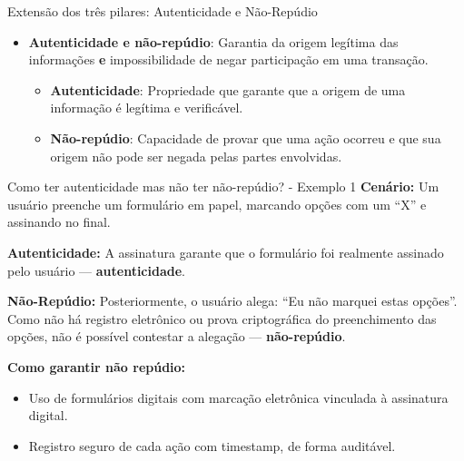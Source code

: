   
\begin{frame}{Extensão dos três pilares: Autenticidade e Não-Repúdio}
 
    \begin{itemize}
        \item \textbf{Autenticidade e não-repúdio}: Garantia da origem legítima das informações \textbf{e} impossibilidade de negar participação em uma transação.
        \begin{itemize}
            \item \textbf{Autenticidade}: Propriedade que garante que a origem de uma informação é legítima e verificável.
        \item  \textbf{Não-repúdio}: Capacidade de provar que uma ação ocorreu e que sua origem não pode ser negada pelas partes envolvidas.\\
        \end{itemize}


        \end{itemize}
       


 
     
\end{frame}

\begin{frame}{Como ter autenticidade mas não ter não-repúdio? - Exemplo 1}
\textbf{Cenário:} Um usuário preenche um formulário em papel, marcando opções com um “X” e assinando no final.

\medskip
\textbf{Autenticidade:}  
A assinatura garante que o formulário foi realmente assinado pelo usuário — \textbf{autenticidade}.

\medskip
\textbf{Não-Repúdio:}  
Posteriormente, o usuário alega: ``Eu não marquei estas opções''.  
Como não há registro eletrônico ou prova criptográfica do preenchimento das opções, não é possível contestar a alegação — \textbf{não-repúdio}.

\medskip
\textbf{Como garantir não repúdio:}
\begin{itemize}
    \item Uso de formulários digitais com marcação eletrônica vinculada à assinatura digital.
    \item Registro seguro de cada ação com timestamp, de forma auditável.
\end{itemize}
\end{frame}


